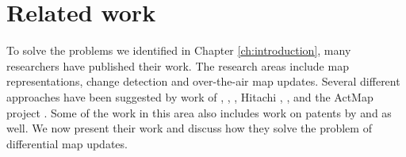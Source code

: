 

\chapter{Related work}\label{ch:relatedwork}

To solve the problems we identified in Chapter \ref{ch:introduction}, many researchers have published their work. The research areas include map representations, change detection and over-the-air map updates. Several different approaches have been suggested by work of \citet{min2008mobile}, \citet{asahara2008locally}, \citet{cooper2001incremental}, Hitachi \cite{hitachi}, \citet{bastiaensen2003actmap}, \citet{sakamoto2000proposal} and the ActMap project \cite{flament2003actmap}. Some of the work in this area also includes work on patents by \citet{kato2002method} and \citet{fischer2012technique} as well. We now present their work and discuss how they solve the problem of differential map updates.





